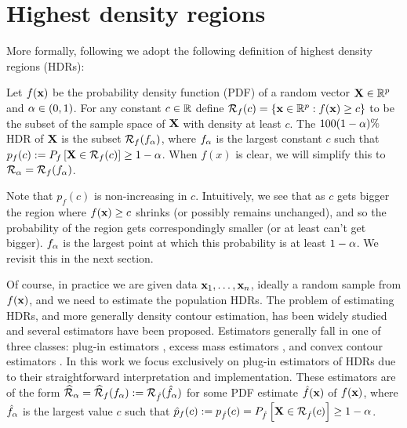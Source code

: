 \pagebreak


\section{Highest density regions}\label{sec:hdrs}

More formally, following \cite{hyndman_computing_1996}  we adopt the following definition of highest density regions (HDRs):

\begin{definition}\label{def:HDR}
Let $f(\textbf{x})$ be the probability density function (PDF) of a random vector $\textbf{X} \in \mathbb{R}^{p}$ and $\alpha \in (0,1)$.
For any constant $c \in \mathbb{R}$ define $\mathcal{R}_{f}(c) = \{\textbf{x} \in \mathbb{R}^{p}: f(\textbf{x}) \geq c\}$ to be the subset of the sample space of $\textbf{X}$ with density at least $c$. The $100(1 - \alpha)\%$ HDR of $\textbf{X}$ is the subset $\mathcal{R}_{f}(f_{\alpha})$, where $f_{\alpha}$ is the largest constant $c$ such that $p_{f}(c) := P_{f}\left[\textbf{X} \in \mathcal{R}_f(c)\right] \geq 1 - \alpha$. When $f(x)$ is clear, we will simplify this to $\mathcal{R}_{\alpha} = \mathcal{R}_{f}(f_{\alpha})$.
\end{definition}

Note that $p_{f}(c)$ is non-increasing in $c$.
Intuitively, we see that as $c$ gets bigger the region where $f(\textbf{x}) \geq c$ shrinks
(or possibly remains unchanged),
and so the probability of the region gets correspondingly smaller (or at least can't get bigger).
$f_{\alpha}$ is the largest point at which this probability is at least $1 - \alpha$.
We revisit this in the next section.

Of course, in practice we are given data $\textbf{x}_{1}, \ldots, \textbf{x}_{n}$, ideally a random sample from $f(\textbf{x})$, and we need to estimate the population HDRs.
The problem of estimating HDRs, and more generally density contour estimation, has been widely studied and several estimators have been proposed.
Estimators generally fall in one of three classes: plug-in estimators \citep{rigollet_optimal_2009, cadre_kernel_2006}, excess mass estimators \citep{muller_excess_1991, polonik_measuring_1995}, and convex contour estimators \citep{hartigan_estimation_1987}.
In this work we focus exclusively on plug-in estimators of HDRs
due to their straightforward interpretation and implementation.
These estimators are of the form $\widehat{\mathcal{R}}_{\alpha} = \widehat{\mathcal{R}}_{f}(f_{\alpha}) := \mathcal{R}_{\hat{f}}(\hat{f}_{\alpha})$ for some PDF estimate $\hat{f}(\textbf{x})$ of $f(\textbf{x})$, where $\hat{f}_{\alpha}$ is the largest value $c$ such that $\hat{p}_{f}(c) := p_{\hat{f}}(c) = P_{\hat{f}}\left[\textbf{X} \in \mathcal{R}_{\hat{f}}(c)\right] \geq 1 - \alpha$.

